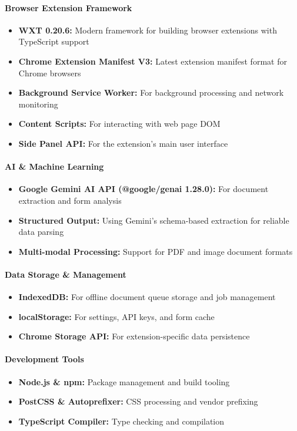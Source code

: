 \documentclass[11pt, a4paper]{article}
\theoremstyle{plain}
\theoremstyle{definition}
\begin{document}
\paragraph{Browser Extension Framework}
\begin{itemize}
    \item \textbf{WXT 0.20.6:} Modern framework for building browser extensions with TypeScript support
    \item \textbf{Chrome Extension Manifest V3:} Latest extension manifest format for Chrome browsers
    \item \textbf{Background Service Worker:} For background processing and network monitoring
    \item \textbf{Content Scripts:} For interacting with web page DOM
    \item \textbf{Side Panel API:} For the extension's main user interface
\end{itemize}

\paragraph{AI \& Machine Learning}
\begin{itemize}
    \item \textbf{Google Gemini AI API (@google/genai 1.28.0):} For document extraction and form analysis
    \item \textbf{Structured Output:} Using Gemini's schema-based extraction for reliable data parsing
    \item \textbf{Multi-modal Processing:} Support for PDF and image document formats
\end{itemize}

\paragraph{Data Storage \& Management}
\begin{itemize}
    \item \textbf{IndexedDB:} For offline document queue storage and job management
    \item \textbf{localStorage:} For settings, API keys, and form cache
    \item \textbf{Chrome Storage API:} For extension-specific data persistence
\end{itemize}

\paragraph{Development Tools}
\begin{itemize}
    \item \textbf{Node.js \& npm:} Package management and build tooling
    \item \textbf{PostCSS \& Autoprefixer:} CSS processing and vendor prefixing
    \item \textbf{TypeScript Compiler:} Type checking and compilation
\end{itemize}
\end{document}
